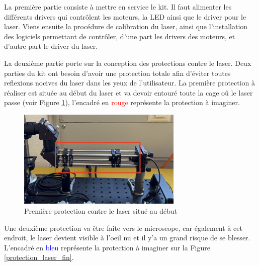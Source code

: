 La première partie consiste à mettre en service le kit. Il faut alimenter les différents drivers qui contrôlent les moteurs, la LED ainsi que le driver pour le laser. Viens ensuite la procédure de calibration du laser, ainsi que l'installation des logiciels permettant de contrôler, d'une part les drivers des moteurs, et d'autre part le driver du laser.

La deuxième partie porte sur la conception des protections contre le laser. Deux parties du kit ont besoin d'avoir une protection totale afin d'éviter toutes reflexions nocives du laser dans les yeux de l'utilisateur. La première protection à réaliser est située au début du laser et va devoir entouré toute la cage oû le laser passe (voir Figure \ref{protection_laser_début}), l'encadré en \textcolor{red}{rouge} représente la protection à imaginer.

\begin{figure}[H]
    \begin{center}
        \includegraphics[width=0.7\textwidth]{assets/figures/figures_introduction/protection_debut_laser.jpeg}
    \end{center}
    \caption{Première protection contre le laser situé au début}
    \label{protection_laser_début}
\end{figure}

Une deuxième protection va être faite vers le microscope, car également à cet endroit, le laser devient visible à l'oeil nu et il y'a un grand risque de se blesser. L'encadré en \textcolor{blue}{bleu} représente la protection à imaginer sur la Figure \ref{protection_laser_fin}.

